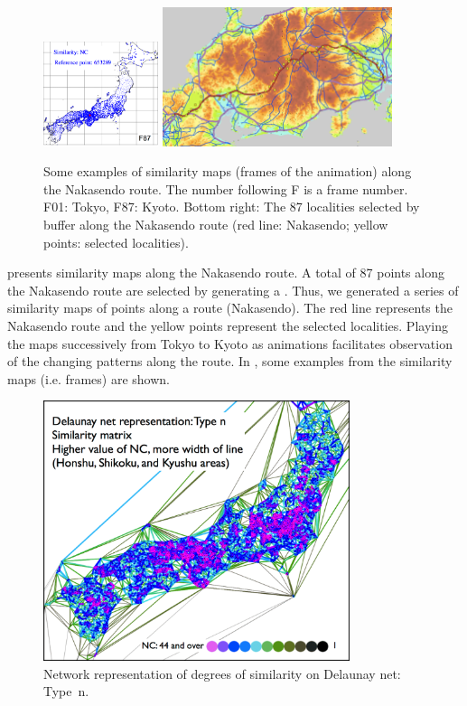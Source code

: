 \documentclass[output=paper]{LSP/langsci}
\begin{document}
\begin{figure}[b]
\\
\includegraphics[width=0.3\textwidth]{illustrations/kuma_fig21-F87}
\includegraphics[width=0.6\textwidth]{illustrations/kuma_fig21-Points}
\caption{Some examples of similarity maps (frames of the animation) along the Nakasendo route. The number following F is a frame number. F01: Tokyo, F87: Kyoto. Bottom right: The 87 localities selected by buffer along the Nakasendo route (red line: Nakasendo; yellow points: selected localities).}          
\label{fig:21}
\end{figure}

 presents similarity maps along the Nakasendo route. A total of 87 points along the Nakasendo route are selected by generating a . Thus, we generated a series of similarity maps of points along a route (Nakasendo). The red line represents the Nakasendo route and the yellow points represent the selected localities. Playing the maps successively from Tokyo to Kyoto as animations facilitates observation of the changing patterns along the route. In , some examples from the similarity maps (i.e. frames) are shown.



\begin{figure}[t]
\includegraphics[width=0.8\textwidth]{illustrations/kuma_fig22}
\caption{Network representation of degrees of similarity on Delaunay net: Type~n.}
\label{fig:22}
\end{figure}
\end{document}

